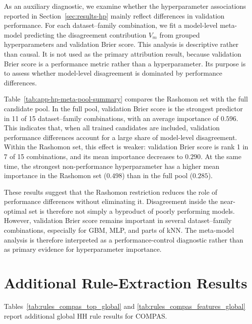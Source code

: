 As an auxiliary diagnostic, we examine whether the hyperparameter associations reported in
Section~\ref{sec:results-hp} mainly reflect differences in validation performance. For
each dataset--family combination, we fit a model-level meta-model predicting the
disagreement contribution $V_m$ from grouped hyperparameters and validation Brier
score. This analysis is descriptive rather than causal. It is not used as the primary
attribution result, because validation Brier score is a performance metric rather than a
hyperparameter. Its purpose is to assess whether model-level disagreement is dominated
by performance differences.

Table~\ref{tab:app-hp-meta-pool-summary} compares the Rashomon set with the full
candidate pool. In the full pool, validation Brier score is the strongest predictor in 11 of
15 dataset--family combinations, with an average importance of $0.596$. This indicates
that, when all trained candidates are included, validation performance differences account 
for a large share of model-level disagreement. Within the Rashomon set, this effect is
weaker: validation Brier score is rank 1 in 7 of 15 combinations, and its mean importance
decreases to $0.290$. At the same time, the strongest non-performance hyperparameter has
a higher mean importance in the Rashomon set ($0.498$) than in the full pool ($0.285$).

These results suggest that the Rashomon restriction reduces the role of performance differences
without eliminating it. Disagreement inside the near-optimal set is therefore not
simply a byproduct of poorly performing models. However, validation Brier score remains
important in several dataset--family combinations, especially for GBM, MLP, and parts of
kNN. The meta-model analysis is therefore interpreted as a performance-control
diagnostic rather than as primary evidence for hyperparameter importance.

\begin{table}[htbp]
\centering
\caption{Meta-model diagnostic summary comparing the Rashomon set with the full
candidate pool. Values are aggregated over 15 dataset--family combinations. ``Brier
rank-1'' reports in how many combinations validation Brier score is the most important
predictor of $V_m$.}
\label{tab:app-hp-meta-pool-summary}

\end{table}

\section{Additional Rule-Extraction Results}
Tables~\ref{tab:rules_compas_top_global} and
\ref{tab:rules_compas_features_global} report additional global HH rule results for
COMPAS.

